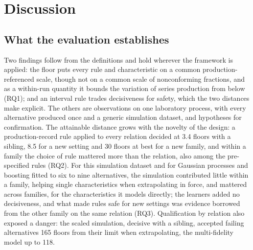 \documentclass[pdflatex,sn-basic,lineno]{sn-jnl}
\begin{document}
\section{Discussion}\label{sec:discussion}

\subsection{What the evaluation establishes}

Two findings follow from the definitions and hold wherever the framework is applied: the floor puts every rule and characteristic on a common production-referenced scale, though not on a common scale of nonconforming fractions, and as a within-run quantity it bounds the variation of series production from below (RQ1); and an interval rule trades decisiveness for safety, which the two distances make explicit. The others are observations on one laboratory process, with every alternative produced once and a generic simulation dataset, and hypotheses for confirmation. The attainable distance grows with the novelty of the design: a production-record rule applied to every relation decided at 3.4 floors with a sibling, 8.5 for a new setting and 30 floors at best for a new family, and within a family the choice of rule mattered more than the relation, also among the pre-specified rules (RQ2). For this simulation dataset and for Gaussian processes and boosting fitted to six to nine alternatives, the simulation contributed little within a family, helping single characteristics when extrapolating in force, and mattered across families, for the characteristics it models directly; the learners added no decisiveness, and what made rules safe for new settings was evidence borrowed from the other family on the same relation (RQ3). Qualification by relation also exposed a danger: the scaled simulation, decisive with a sibling, accepted failing alternatives 165 floors from their limit when extrapolating, the multi-fidelity model up to 118.
\end{document}
